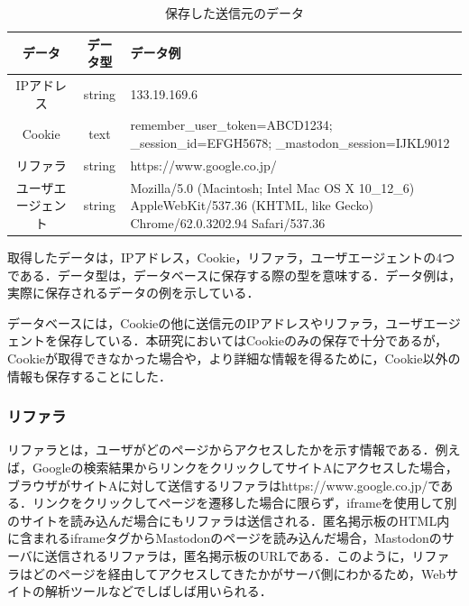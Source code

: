 \documentclass[10pt, a4paper]{jreport}
\begin{document}
\begin{table}[H]
	\caption{保存した送信元のデータ}
	\label{tb: buttons_database}
	\begin{center}
		\scalebox{0.8} {
			\begin{tabular}{ | c | c | p{8cm} | } \hline

データ & データ型 & データ例 \\ \hline
IPアドレス & string & 133.19.169.6 \\ \hline
Cookie & text & remember\_user\_token=ABCD1234; \_session\_id=EFGH5678; \_mastodon\_session=IJKL9012  \\ \hline
リファラ & string & https://www.google.co.jp/ \\ \hline
ユーザエージェント & string & Mozilla/5.0 (Macintosh; Intel Mac OS X 10\_12\_6) AppleWebKit/537.36 (KHTML, like Gecko) Chrome/62.0.3202.94 Safari/537.36 \\ \hline

			\end{tabular}
		}
	\end{center}
\end{table}

取得したデータは，IPアドレス，Cookie，リファラ，ユーザエージェントの4つである．データ型は，データベースに保存する際の型を意味する．データ例は，実際に保存されるデータの例を示している．

データベースには，Cookieの他に送信元のIPアドレスやリファラ，ユーザエージェントを保存している．本研究においてはCookieのみの保存で十分であるが，Cookieが取得できなかった場合や，より詳細な情報を得るために，Cookie以外の情報も保存することにした．

\subsubsection*{リファラ}
リファラとは，ユーザがどのページからアクセスしたかを示す情報である．例えば，Googleの検索結果からリンクをクリックしてサイトAにアクセスした場合，ブラウザがサイトAに対して送信するリファラはhttps://www.google.co.jp/である．リンクをクリックしてページを遷移した場合に限らず，iframeを使用して別のサイトを読み込んだ場合にもリファラは送信される．匿名掲示板のHTML内に含まれるiframeタグからMastodonのページを読み込んだ場合，Mastodonのサーバに送信されるリファラは，匿名掲示板のURLである．このように，リファラはどのページを経由してアクセスしてきたかがサーバ側にわかるため，Webサイトの解析ツールなどでしばしば用いられる．
\end{document}
